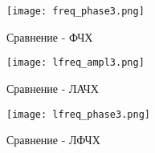\begin{figure}[ht]
    \centering
    \texttt{[image: freq\_phase3.png]}
  \caption{Сравнение - ФЧХ}
  \end{figure}
\newpage
\begin{figure}[ht]
    \centering
    \texttt{[image: lfreq\_ampl3.png]}
  \caption{Сравнение - ЛАЧХ}
  \end{figure}
  
  \begin{figure}[ht]
      \centering
      \texttt{[image: lfreq\_phase3.png]}
    \caption{Сравнение - ЛФЧХ}
    \end{figure}
    
\newpage

\endinput